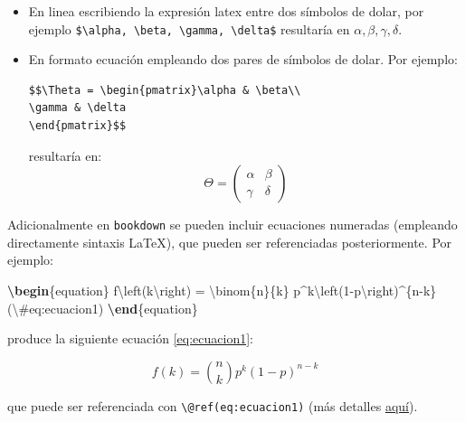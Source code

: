 \documentclass[]{book}
\newenvironment{Shaded}{\begin{snugshade}}{\end{snugshade}}
\newcommand{\KeywordTok}[1]{\textcolor[rgb]{0.13,0.29,0.53}{\textbf{#1}}}
\newcommand{\SpecialCharTok}[1]{\textcolor[rgb]{0.00,0.00,0.00}{#1}}
\newcommand{\SpecialStringTok}[1]{\textcolor[rgb]{0.31,0.60,0.02}{#1}}
\newcommand{\ExtensionTok}[1]{#1}
\newcommand{\NormalTok}[1]{#1}
\theoremstyle{definition}
\theoremstyle{definition}
\theoremstyle{definition}
\theoremstyle{remark}
\begin{document}
\begin{itemize}
\item
  En linea escribiendo la expresión latex entre dos símbolos de dolar,
  por ejemplo
  \texttt{\$\textbackslash{}alpha,\ \textbackslash{}beta,\ \textbackslash{}gamma,\ \textbackslash{}delta\$}
  resultaría en \(\alpha, \beta, \gamma, \delta\).
\item
  En formato ecuación empleando dos pares de símbolos de dolar. Por
  ejemplo:

\begin{verbatim}
$$\Theta = \begin{pmatrix}\alpha & \beta\\
\gamma & \delta
\end{pmatrix}$$
\end{verbatim}

  resultaría en: \[\Theta = \begin{pmatrix}\alpha & \beta\\
  \gamma & \delta
  \end{pmatrix}\]
\end{itemize}

Adicionalmente en \texttt{bookdown} se pueden incluir ecuaciones
numeradas (empleando directamente sintaxis LaTeX), que pueden ser
referenciadas posteriormente. Por ejemplo:

\begin{Shaded}
\begin{Highlighting}[]
\KeywordTok{\textbackslash{}begin}\NormalTok{\{}\ExtensionTok{equation}\NormalTok{\}}\SpecialStringTok{ }
\SpecialStringTok{  f}\SpecialCharTok{\textbackslash{}left}\SpecialStringTok{(k}\SpecialCharTok{\textbackslash{}right}\SpecialStringTok{) = }\SpecialCharTok{\textbackslash{}binom}\SpecialStringTok{\{n\}\{k\} p^k}\SpecialCharTok{\textbackslash{}left}\SpecialStringTok{(1-p}\SpecialCharTok{\textbackslash{}right}\SpecialStringTok{)^\{n-k\}}
\SpecialStringTok{  (}\SpecialCharTok{\textbackslash{}#}\SpecialStringTok{eq:ecuacion1)}
\KeywordTok{\textbackslash{}end}\NormalTok{\{}\ExtensionTok{equation}\NormalTok{\}}
\end{Highlighting}
\end{Shaded}

produce la siguiente ecuación \eqref{eq:ecuacion1}:

\begin{equation}
f\left(k\right)=\binom{n}{k}p^k\left(1-p\right)^{n-k} \label{eq:ecuacion1}
\end{equation}

que puede ser referenciada con
\texttt{\textbackslash{}@ref(eq:ecuacion1)} (más detalles
\href{https://bookdown.org/yihui/bookdown/markdown-extensions-by-bookdown.html\#equations}{aquí}).
\end{document}
